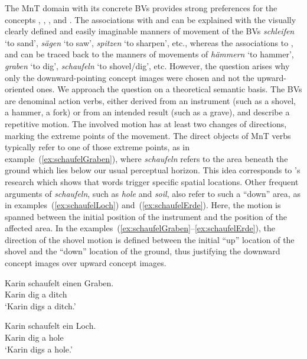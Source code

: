 \documentclass[output=paper]{langsci/langscibook}
\begin{document}
The MnT domain with its concrete BVs provides strong
preferences for the concepts ,
, ,  and
. The associations with  and
 can be explained with the visually clearly defined
and easily imaginable manners of movement of the BVs
\textit{schleifen} `to sand', \textit{sägen} `to saw',
\textit{spitzen} `to sharpen', etc., whereas the associations to
,  and  can
be traced back to the manners of movements of \textit{hämmern} `to
hammer', \textit{graben} `to dig', \textit{schaufeln} `to
shovel/dig', etc. However, the question arises why only the
downward-pointing concept images were chosen and not the upward-oriented ones. We
approach the question on a theoretical semantic basis. The BVs are
denominal action verbs, either derived from an instrument (such as a
shovel, a hammer, a fork) or from an intended result (such as a
grave), and describe a repetitive motion. The involved motion has at
least two changes of directions, marking the extreme points of the
movement. The direct objects of MnT verbs typically refer to
one of those extreme points, as in example~(\ref{ex:schaufelGraben}),
where \textit{schaufeln} refers to the area beneath the ground which
lies below our usual perceptual horizon. This idea corresponds to
\cite{LachmairEtAl:16}'s research which shows that words trigger
specific spatial locations. Other frequent arguments of
\textit{schaufeln}, such as \textit{hole} and \textit{soil}, also
refer to such a ``down'' area, as in examples~(\ref{ex:schaufelLoch})
and~(\ref{ex:schaufelErde}). Here, the motion is spanned between the
initial position of the instrument and the position of the affected
area. In the
examples~(\ref{ex:schaufelGraben}--\ref{ex:schaufelErde}), the
direction of the shovel motion is defined between the initial ``up''
location of the shovel and the ``down'' location of the ground, thus
justifying the downward concept images over upward concept images.

\ea\label{ex:schaufelGraben} 
\gll Karin schaufelt einen Graben.\\ 
Karin dig a ditch\\
\glt `Karin digs a ditch.'
\z 

\ea\label{ex:schaufelLoch} 
\gll Karin schaufelt ein Loch.\\ 
Karin dig a hole\\
\glt `Karin digs a hole.'
\z  
\end{document}
